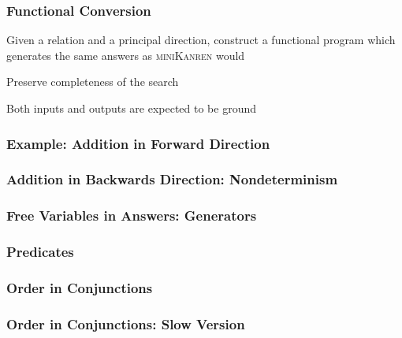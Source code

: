 \documentclass[xcolor=table]{beamer}
\newcommand{\mk}{\textsc{miniKanren}\xspace}
\begin{document}
\begin{frame}[fragile]
  \frametitle{Functional Conversion}
\begin{center}
  Given a relation and a principal direction, construct a functional program which generates the same answers as \mk would
\end{center}

\vfill

\begin{center}
  Preserve completeness of the search
\end{center}

\vfill

\begin{center}
Both inputs and outputs are expected to be ground
\end{center}
\end{frame}

\lstset{basicstyle=\small}

\begin{frame}[fragile]
  \frametitle{Example: Addition in Forward Direction}



\end{frame}

\begin{frame}[fragile]
  \frametitle{Addition in Backwards Direction: Nondeterminism}



\end{frame}

\begin{frame}[fragile]
  \frametitle{Free Variables in Answers: Generators}



\end{frame}

\begin{frame}[fragile]
  \frametitle{Predicates}
  

  
\end{frame}


\begin{frame}[fragile]
  \frametitle{Order in Conjunctions}
  
\end{frame}

\begin{frame}[fragile]
  \frametitle{Order in Conjunctions: Slow Version}
  
\end{frame}
\end{document}
